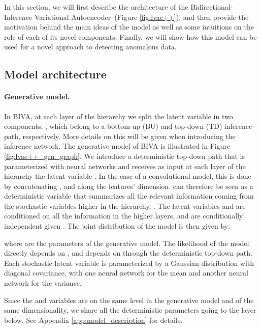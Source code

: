 \documentclass{article}
\def\name{Bidirectional-Inference Variational Autoencoder}
\def\nm{BIVA\xspace}
\begin{document}
In this section, we will first describe the architecture of the \name\ (Figure \ref{fig:lvae++}), and then provide the motivation behind the main ideas of the model as well as some intuitions on the role of each of its novel components. Finally, we will show how this model can be used for a novel approach to detecting anomalous data.

\subsection{Model architecture}
\paragraph{Generative model.} In \nm, at each layer  of the hierarchy we split the latent variable in two components, , which belong to a bottom-up (BU) and top-down (TD) inference path, respectively. More details on this will be given when introducing the inference network. The generative model of \nm is illustrated in Figure \ref{fig:lvae++_gen_graph}.
We introduce a deterministic top-down path  that is parameterized with neural networks and receives as input at each layer  of the hierarchy the latent variable . In the case of a convolutional model, this is done by concatenating ,  and  along the features' dimension.  can therefore be seen as a deterministic variable that summarizes all the relevant information coming from the stochastic variables higher in the hierarchy, .  The latent variables  and  are conditioned on all the information in the higher layers, and are conditionally independent given .
The joint distribution of the model is then given by:

where  are the parameters of the generative model.
The likelihood of the model  directly depends on , and depends on  through the deterministic top-down path.
Each stochastic latent variable  is parameterized by a Gaussian distribution with diagonal covariance, with one neural network  for the mean and another neural network  for the variance.
\iffalse
:
\todo[inline]{Collapse this into the text.}

where  denotes a distribution that is chosen on the basis of the type of the data in the input distribution. 
\fi
Since the  and  variables are on the same level in the generative model and of the same dimensionality, we share all the deterministic parameters going to the layer below. See Appendix \ref{app:model_description} for details.
\end{document}

